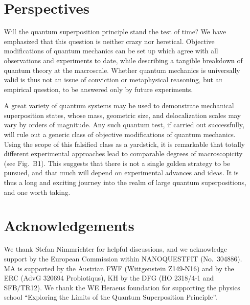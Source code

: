 \documentclass[12pt]{article}
\begin{document}
\section{Perspectives}

Will the quantum superposition principle stand the test of time? We have emphasized that this question is neither crazy nor heretical. Objective modifications of quantum mechanics can be set up which agree with all observations and experiments to date, while describing a tangible breakdown of quantum theory at the macroscale. Whether quantum mechanics is universally valid is thus not an issue of conviction or metaphysical reasoning, but an empirical question, to be answered only by future experiments.

A great variety of quantum systems may be used to demonstrate mechanical superposition states, whose mass, geometric size,  and delocalization scales may vary by orders of magnitude. Any such quantum test, if carried out successfully, will rule out a generic class of objective modifications of quantum mechanics.
Using the scope of this  falsified class as a
yardstick, it is remarkable that totally different experimental approaches
lead to comparable degrees of macroscopicity (see Fig.~B1).
This suggests that there is not a single golden strategy to be pursued, and that much will depend on experimental advances and ideas.
It is thus a long and exciting journey into the realm of large quantum superpositions, and one worth taking.




\section{Acknowledgements}

We thank Stefan Nimmrichter for helpful discussions, and we
acknowledge support by the European Commission within NANOQUESTFIT (No.~304886). MA is supported by the Austrian FWF (Wittgenstein Z149-N16) and by the ERC (AdvG 320694 Probiotiqus), KH by the DFG (HO 2318/4-1 and SFB/TR12).  We thank the WE Heraeus foundation for supporting the physics school ``Exploring the Limits of the Quantum Superposition Principle''.
\end{document}
